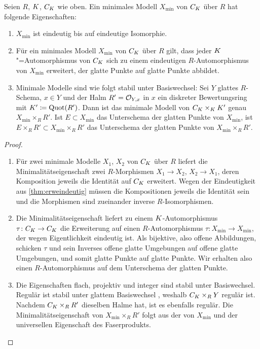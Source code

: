 \documentclass[german, bibliography=totoc]{scrreprt}
\renewcommand*{\optcite}[2][]{}
\begin{document}
\begin{Satz}\label{thm:eigminmodell}
  Seien $R$, $K$, $C_{K}$ wie oben.
  Ein minimales Modell $X_{\text{min}}$ von $C_{K}$ über $R$ hat
  folgende Eigenschaften:
  \begin{enumerate}[label=(\roman*)]
  \item $X_{\text{min}}$ ist eindeutig bis auf eindeutige Isomorphie.
  \item\optcite[Proposition IV.4.6]{silverman2}
    Für ein minimales Modell $X_{\text{min}}$ von $C_{K}$ über $R$
    gilt, dass jeder $K$"=Automorphismus von $C_{K}$ sich zu
    einem eindeutigen $R$-Automorphismus von $X_{\text{min}}$
    erweitert, der glatte Punkte auf glatte Punkte abbildet.
  \item\optcite[Beweis von Proposition IV.6.10]{silverman2}
    Minimale Modelle sind wie folgt stabil unter Basiswechsel:
    Sei $Y$ glattes $R$-Schema, $x\in Y$ und der Halm $R'=\mathcal{O}_{Y,x}$ in
    $x$  ein diskreter Bewertungsring mit $K'\coloneqq\operatorname{Quot}(R')$.
    Dann ist das minimale Modell von $C_{K}\times_{K}K'$ genau
    $X_{\text{min}}\times_R R'$.
    Ist $E\subset X_{\text{min}}$ das Unterschema der glatten Punkte
    von $X_{\text{min}}$, ist
    $E\times_R R'\subset X_{\text{min}}\times_R R'$ das Unterschema
    der glatten Punkte von $X_{\text{min}}\times_R R'$.
  \end{enumerate}
  \begin{proof}
    \begin{enumerate}[label=(\roman*)]
    \item Für zwei minimale Modelle $X_1$, $X_2$ von $C_{K}$ über $R$
      liefert die Minimalitätseigenschaft zwei $R$-Morphismen
      $X_1\to X_2$, $X_2\to X_1$, deren Komposition jeweils die
      Identität auf $C_{K}$ erweitert. Wegen der Eindeutigkeit aus
      \ref{thm:erweindeutig} müssen die Kompositionen jeweils die
      Identität sein und die Morphismen sind zueinander inverse
      $R$-Isomorphismen.
    \item Die Minimalitätseigenschaft liefert zu einem
      $K$-Automorphismus $\tau\colon C_{K}\to C_{K}$ die Erweiterung auf
      einen $R$-Automorphismus
      $\tau\colon X_{\text{min}}\to X_{\text{min}}$, der wegen
      Eigentlichkeit eindeutig ist.
      Als bijektive, also offene Abbildungen, schicken $\tau$ und
      sein Inverses offene glatte Umgebungen auf offene glatte
      Umgebungen, und somit glatte Punkte auf glatte Punkte. Wir
      erhalten also einen $R$-Automorphismus auf dem Unterschema der
      glatten Punkte.
    \item Die Eigenschaften flach, projektiv und integer sind stabil
      unter Basiswechsel. Regulär ist stabil unter glattem
      Basiswechsel \cite[Chapter 2.3, Page 49]{neron}, weshalb
      $C_{K}\times_R Y$ regulär ist.
      Nachdem $C_{K}\times_R R'$ dieselben Halme hat, ist es ebenfalls
      regulär.
      Die Minimalitätseigenschaft von $X_{\text{min}}\times_R R'$
      folgt aus der von $X_{\text{min}}$ und der universellen
      Eigenschaft des Faserprodukts.
      

\end{enumerate}
\end{proof}
\end{Satz}
\end{document}
